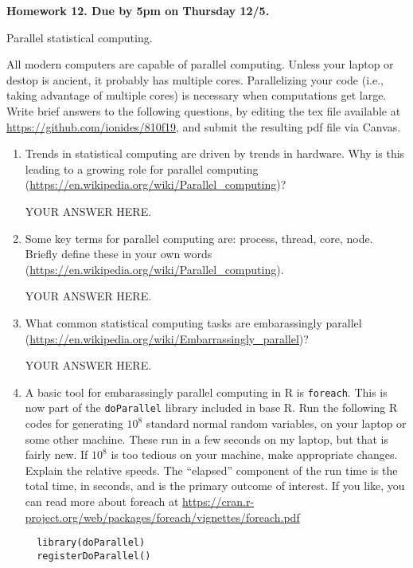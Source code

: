 \documentclass[12pt]{article}
\begin{document}
\begin{center}\bf
Homework 12. Due by 5pm on Thursday 12/5.

Parallel statistical computing.

\end{center}

All modern computers are capable of parallel computing. Unless your laptop or destop is ancient, it probably has multiple cores. Parallelizing your code (i.e., taking advantage of multiple cores) is necessary when computations get large. Write brief answers to the following questions, by editing the tex file available at \url{https://github.com/ionides/810f19}, and submit the resulting pdf file via Canvas. 

\begin{enumerate}

\item Trends in statistical computing are driven by trends in hardware. Why is this leading to a growing role for parallel computing (\url{https://en.wikipedia.org/wiki/Parallel_computing})? 

  YOUR ANSWER HERE.

\item Some key terms for parallel computing are: process, thread, core, node. Briefly define these in your own words (\url{https://en.wikipedia.org/wiki/Parallel_computing}).

  YOUR ANSWER HERE.
  
\item What common statistical computing tasks are embarassingly parallel (\url{https://en.wikipedia.org/wiki/Embarrassingly_parallel})?

  YOUR ANSWER HERE.

\item A basic tool for embarassingly parallel computing in R is \texttt{foreach}. This is now part of the \texttt{doParallel} library included in base R. Run the following R codes for generating $10^8$ standard normal random variables, on your laptop or some other machine.  These run in a few seconds on my laptop, but that is fairly new. If $10^8$ is too tedious on your machine, make appropriate changes. Explain the relative speeds. The ``elapsed'' component of the run time is the total time, in seconds, and is the primary outcome of interest. If you like, you can read more about foreach at \url{https://cran.r-project.org/web/packages/foreach/vignettes/foreach.pdf}

\begin{verbatim} 
  library(doParallel)
  registerDoParallel()


\end{verbatim}
\end{enumerate}
\end{document}
